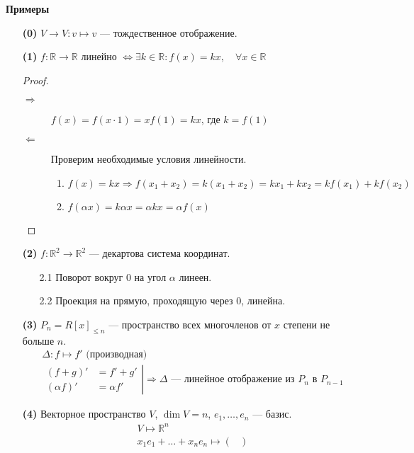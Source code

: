 \vspace{0.3cm}
\textbf{Примеры}
\begin{itemize}
\item[\textbf{(0)}] $V \rightarrow V: v \mapsto v$ --- тождественное отображение.
\item[\textbf{(1)}] $f: \mathbb{R} \rightarrow \mathbb{R}$ линейно $\Leftrightarrow \exists k \in \mathbb{R}: f(x) = kx, \quad \forall x \in \mathbb{R}$
\begin{proof} \
\begin{description}
\item[$\Rightarrow$] $f(x) = f(x \cdot 1) = xf(1) = kx$, где $k = f(1)$
\item[$\Leftarrow$] Проверим необходимые условия линейности.
\begin{enumerate}
\item $f(x) = kx \Rightarrow f(x_1 + x_2) = k(x_1 + x_2) = kx_1 + kx_2 = kf(x_1) + kf(x_2)$
\item $f(\alpha x) = k\alpha x = \alpha k x = \alpha f(x)$
\end{enumerate}
\end{description}
\end{proof}
\item[\textbf{(2)}] $f: \mathbb{R}^2 \rightarrow \mathbb{R}^2$ --- декартова система координат.
\begin{itemize}
\item[2.1] Поворот вокруг 0 на угол $\alpha$ линеен.
\item[2.2] Проекция на прямую, проходящую через 0, линейна.
\end{itemize}
\item[\textbf{(3)}] $P_n = R[x]_{\leqslant n}$ --- пространство всех многочленов от $x$ степени не больше $n$.
\begin{gather*}
\Delta : f \mapsto f' \text{ (производная)} \\
\left.
\begin{aligned}
(f+g)' &= f' + g' \\
(\alpha f)' &= \alpha f'
\end{aligned}
\right| \Rightarrow \Delta \text{ --- линейное отображение из $P_n$ в $P_{n-1}$}
\end{gather*}
\item[\textbf{(4)}] Векторное пространство $V$, $\dim V = n$, $e_1, \ldots, e_n$ --- базис.
\begin{gather*}
V \mapsto \mathbb{R}^n \\
x_1e_1 + \ldots + x_ne_n \mapsto 
\begin{pmatrix*}

\end{pmatrix*}
\end{gather*}
\end{itemize}
